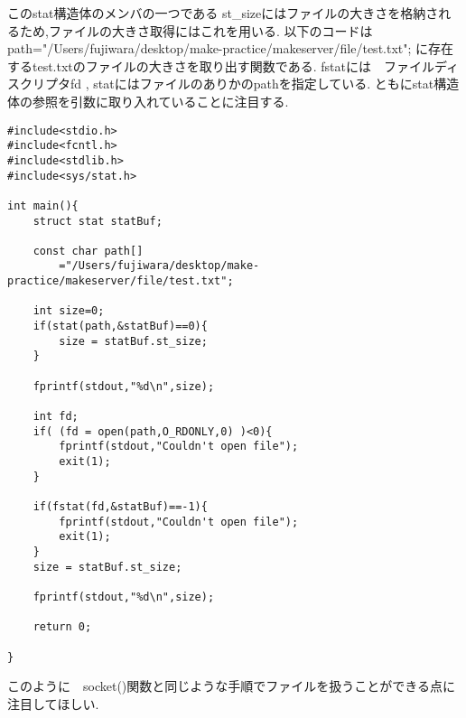 \documentclass[a4paper]{article}%
\begin{document}
このstat構造体のメンバの一つである st\_sizeにはファイルの大きさを格納されるため,ファイルの大きさ取得にはこれを用いる.
以下のコードはpath="/Users/fujiwara/desktop/make-practice/makeserver/file/test.txt";
に存在するtest.txtのファイルの大きさを取り出す関数である.
fstatには　ファイルディスクリプタfd , statにはファイルのありかのpathを指定している.
ともにstat構造体の参照を引数に取り入れていることに注目する.
\begin{lstlisting}[caption=fileexample, label=fiileexample]
#include<stdio.h>
#include<fcntl.h>
#include<stdlib.h>
#include<sys/stat.h>

int main(){
    struct stat statBuf;

    const char path[]
    	="/Users/fujiwara/desktop/make-practice/makeserver/file/test.txt";
    
    int size=0;
    if(stat(path,&statBuf)==0){
        size = statBuf.st_size;
    }

    fprintf(stdout,"%d\n",size);
    
    int fd;
    if( (fd = open(path,O_RDONLY,0) )<0){
        fprintf(stdout,"Couldn't open file");
        exit(1);
    }   

    if(fstat(fd,&statBuf)==-1){
        fprintf(stdout,"Couldn't open file");
        exit(1);
    }
    size = statBuf.st_size;
    
    fprintf(stdout,"%d\n",size);
    
    return 0;

}
\end{lstlisting}

このように　socket()関数と同じような手順でファイルを扱うことができる点に注目してほしい.
\end{document}
